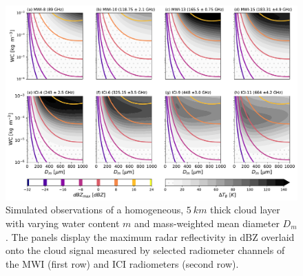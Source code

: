 \begin{figure}
\centering
\DIFdelbeginFL %
\DIFdelendFL \DIFaddbeginFL \includegraphics[width = 1.0\textwidth]{../plots/contours}
\DIFaddendFL \caption{Simulated observations of a homogeneous, $5\ \unit{km}$ thick cloud
  layer with varying water content $m$ and mass-weighted mean diameter $D_m$.
  The panels display the maximum radar reflectivity in dBZ
  \DIFaddbeginFL {}\DIFaddendFL overlaid onto the cloud signal \DIFaddbeginFL {}\DIFaddendFL measured by selected radiometer channels of the MWI (first row) and ICI
  radiometers (second row).}
\label{fig:contours}
\end{figure}

%
%
%
%

